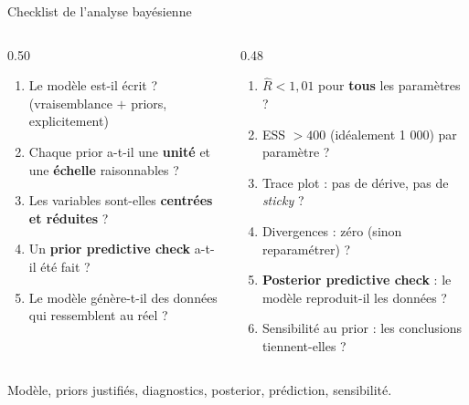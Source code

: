 \begin{frame}{Checklist de l'analyse bayésienne}
\begin{columns}[t]
\begin{column}{0.50\textwidth}
\begin{abox}
\begin{enumerate}
  \item Le modèle est-il écrit ? (vraisemblance $+$ priors, explicitement)
  \item Chaque prior a-t-il une \textbf{unité} et une \textbf{échelle} raisonnables ?
  \item Les variables sont-elles \textbf{centrées et réduites} ?
  \item Un \textbf{prior predictive check} a-t-il été fait ?
  \item Le modèle génère-t-il des données qui ressemblent au réel ?
\end{enumerate}
\end{abox}
\end{column}
\begin{column}{0.48\textwidth}
\begin{solbox}
\begin{enumerate}
  \item $\hat R < 1{,}01$ pour \textbf{tous} les paramètres ?
  \item ESS $> 400$ (idéalement 1 000) par paramètre ?
  \item Trace plot : pas de dérive, pas de \emph{sticky} ?
  \item Divergences : zéro (sinon reparamétrer) ?
  \item \textbf{Posterior predictive check} : le modèle reproduit-il les données ?
  \item Sensibilité au prior : les conclusions tiennent-elles ?
\end{enumerate}
\end{solbox}
\end{column}
\end{columns}
\vspace{1.5mm}
\begin{kbox}
Modèle, priors justifiés, diagnostics, posterior, prédiction, sensibilité.
\end{kbox}
\end{frame}


